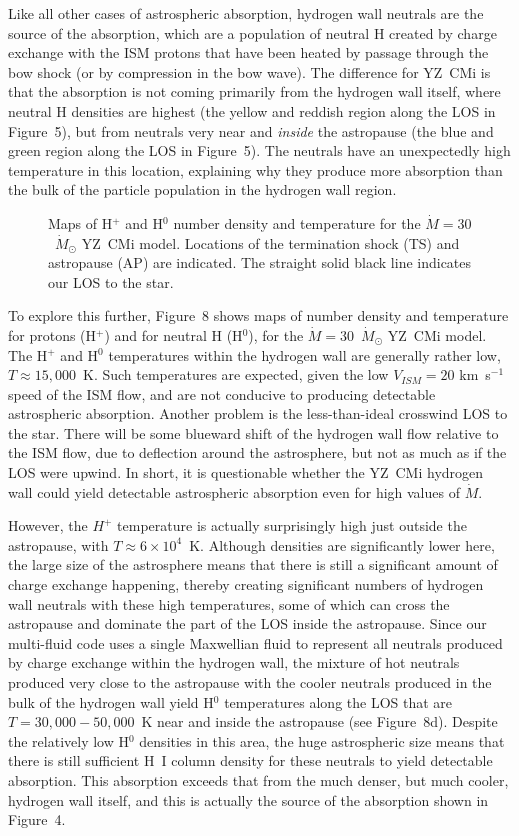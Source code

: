\documentclass[preprint]{aastex}
\begin{document}
     Like all other cases of astrospheric absorption, hydrogen wall
neutrals are the source of the absorption, which are a population of
neutral H created by charge exchange with the ISM protons that have been
heated by passage through the bow shock (or by compression in the bow wave).
The difference for YZ~CMi is that the absorption is not coming primarily
from the hydrogen wall itself, where neutral H densities are highest (the
yellow and reddish region along the LOS in Figure~5), but from neutrals
very near and {\em inside} the astropause (the blue and green region along
the LOS in Figure~5).  The neutrals have an unexpectedly high temperature in
this location, explaining why they produce more absorption than the bulk of
the particle population in the hydrogen wall region.

\begin{figure}[t]
\caption{Maps of H$^+$ and H$^0$ number density and temperature for
  the $\dot{M}=30$~$\dot{M}_{\odot}$ YZ~CMi model.  Locations of the
  termination shock (TS) and astropause (AP) are indicated.  The straight
  solid black line indicates our LOS to the star.}
\end{figure}
     To explore this further, Figure~8 shows maps of number density and
temperature for protons (H$^+$) and for neutral H (H$^0$), for the
$\dot{M}=30$~$\dot{M}_{\odot}$ YZ~CMi model.  The H$^+$ and H$^0$ temperatures
within the hydrogen wall are generally rather low, $T\approx 15,000$~K.
Such temperatures are expected, given the low $V_{ISM}=20$ km~s$^{-1}$
speed of the ISM flow, and are not conducive to producing detectable
astrospheric absorption.  Another problem is the less-than-ideal crosswind
LOS to the star.  There will be some blueward shift of the hydrogen wall
flow relative to the ISM flow, due to deflection around the astrosphere,
but not as much as if the LOS were upwind.  In short, it is questionable
whether the YZ~CMi hydrogen wall could yield detectable astrospheric
absorption even for high values of $\dot{M}$.

     However, the $H^+$ temperature is actually surprisingly high just
outside the astropause, with $T\approx 6\times 10^4$~K.  Although densities are
significantly lower here, the large size of the astrosphere means that there
is still a significant amount of charge exchange happening, thereby creating
significant numbers of hydrogen wall neutrals with these high temperatures, some
of which can cross the astropause and dominate the part of the LOS inside
the astropause.  Since our multi-fluid code uses a single Maxwellian fluid
to represent all neutrals produced by charge exchange within the hydrogen
wall, the mixture of hot neutrals produced very close to the astropause with
the cooler neutrals produced in the bulk of the hydrogen wall yield H$^0$
temperatures along the LOS that are $T=30,000-50,000$~K near and inside the
astropause (see Figure~8d).  Despite the relatively low H$^0$ densities
in this area, the huge astrospheric size means that there is still
sufficient H~I column density for these neutrals to yield detectable
absorption.  This absorption exceeds that from the much denser, but much
cooler, hydrogen wall itself, and this is actually the source of the
absorption shown in Figure~4.
\end{document}
